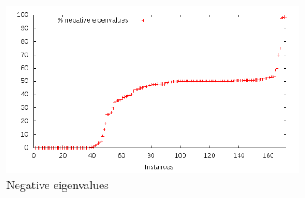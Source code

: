 \begin{figure}\centering
  \includegraphics[width=0.85\textwidth]{pic_neg_eig.png}
  \caption{Negative eigenvalues \label{fig:pic_neg_eig}}
\end{figure}

















